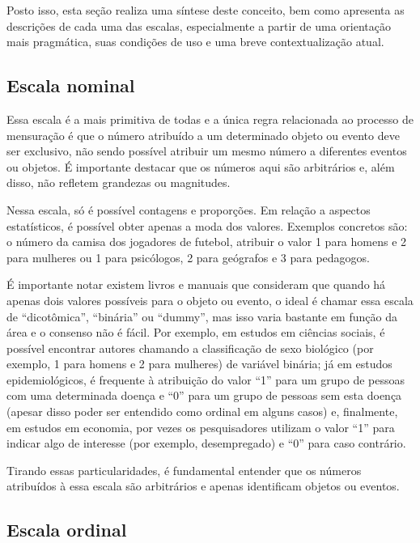 \documentclass[
]{book}
\begin{document}
Posto isso, esta seção realiza uma síntese deste conceito, bem como apresenta as descrições de cada uma das escalas, especialmente a partir de uma orientação mais pragmática, suas condições de uso e uma breve contextualização atual.

\hypertarget{escala-nominal}{%
\subsection{Escala nominal}\label{escala-nominal}}

Essa escala é a mais primitiva de todas e a única regra relacionada ao processo de mensuração é que o número atribuído a um determinado objeto ou evento deve ser exclusivo, não sendo possível atribuir um mesmo número a diferentes eventos ou objetos. É importante destacar que os números aqui são arbitrários e, além disso, não refletem grandezas ou magnitudes.

Nessa escala, só é possível contagens e proporções. Em relação a aspectos estatísticos, é possível obter apenas a moda dos valores. Exemplos concretos são: o número da camisa dos jogadores de futebol, atribuir o valor 1 para homens e 2 para mulheres ou 1 para psicólogos, 2 para geógrafos e 3 para pedagogos.

É importante notar existem livros e manuais que consideram que quando há apenas dois valores possíveis para o objeto ou evento, o ideal é chamar essa escala de ``dicotômica'', ``binária'' ou ``dummy'', mas isso varia bastante em função da área e o consenso não é fácil. Por exemplo, em estudos em ciências sociais, é possível encontrar autores chamando a classificação de sexo biológico (por exemplo, 1 para homens e 2 para mulheres) de variável binária; já em estudos epidemiológicos, é frequente à atribuição do valor ``1'' para um grupo de pessoas com uma determinada doença e ``0'' para um grupo de pessoas sem esta doença (apesar disso poder ser entendido como ordinal em alguns casos) e, finalmente, em estudos em economia, por vezes os pesquisadores utilizam o valor ``1'' para indicar algo de interesse (por exemplo, desempregado) e ``0'' para caso contrário.

Tirando essas particularidades, é fundamental entender que os números atribuídos à essa escala são arbitrários e apenas identificam objetos ou eventos.

\hypertarget{escala-ordinal}{%
\subsection{Escala ordinal}\label{escala-ordinal}}
\end{document}
